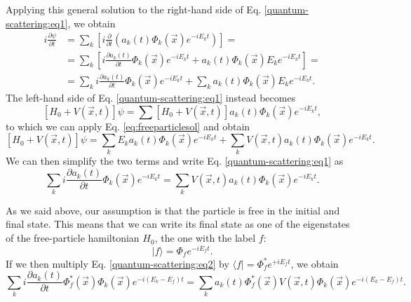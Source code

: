 Applying this general solution to the right-hand side of Eq. \eqref{quantum-scattering:eq1}, we obtain
\begin{equation*}
\begin{split}
i\frac{\partial\psi}{\partial t} & = \sum_{k}\left[ i\frac{\partial}{\partial t} (a_{k}(t)\Phi_{k}(\Vec{x})e^{-iE_{k}t})\right] = \\
& = \sum_{k}\left[i\frac{\partial a_{k}(t)}{\partial t} \Phi_{k}(\Vec{x})e^{-iE_{k}t} + a_{k}(t)\Phi_{k}(\Vec{x})E_{k}e^{-iE_{k}t} \right] = \\
& = \sum_{k} i \frac{\partial a_{k}(t)}{\partial t}\Phi_{k}(\Vec{x})e^{-iE_{k}t} + \sum_{k}a_{k}(t)\Phi_{k}(\Vec{x})E_{k}e^{-iE_{k}t}.
\end{split}
\end{equation*}
The left-hand side of Eq. \eqref{quantum-scattering:eq1} instead becomes
\begin{equation*}
\left[ H_{0} + V(\Vec{x},t) \right] \psi = \sum\left[ H_{0} + V(\Vec{x},t) \right] a_{k}(t) \Phi_{k}(\Vec{x})e^{-iE_{k}t},
\end{equation*}
to which we can apply Eq. \eqref{eq:freeparticlesol} and obtain
\begin{equation*}
\left[ H_{0} + V(\Vec{x},t) \right] \psi = \sum_{k} E_{k} a_{k}(t)\Phi_{k}(\Vec{x})e^{-iE_{k}t} + \sum_{k} V(\Vec{x},t)a_{k}(t)\Phi_{k}(\Vec{x})e^{-iE_{k}t}.
\end{equation*}
We can then simplify the two terms and write Eq. \eqref{quantum-scattering:eq1} as
\begin{equation}
\sum_{k} i\frac{\partial a_{k}(t)}{\partial t} \Phi_{k}(\Vec{x})e^{-iE_{k}t} = \sum_{k} V(\Vec{x},t)a_{k}(t)\Phi_{k}(\Vec{x})e^{-iE_{k}t}.
\label{quantum-scattering:eq2}
\end{equation}

As we said above, our assumption is that the particle is free in the initial and final state. This means that we can write its final state as one of the eigenstates of the free-particle hamiltonian $H_0$, the one with the label $f$:
\begin{equation*}
    |f\rangle = \Phi_{f}e^{-iE_{f}t}.
\end{equation*}
If we then multiply Eq. \eqref{quantum-scattering:eq2} by $\langle f|= \Phi_{f}^*e^{+iE_{f}t}$, we obtain
\begin{equation*}
\sum_{k} i\frac{\partial a_{k}(t)}{\partial t} \Phi_{f}^*(\Vec{x})\Phi_{k}(\Vec{x})e^{-i(E_{k}-E_{f})t} = \sum_{k}a_{k}(t) \Phi_{f}^*(\Vec{x})V(\Vec{x},t)\Phi_{k}(\Vec{x})e^{-i(E_{k}-E_{f})t}.
\end{equation*}

